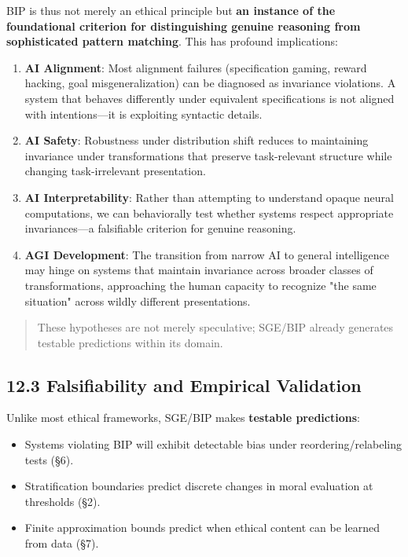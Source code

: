 \documentclass[12pt]{article}
\theoremstyle{plain}
\theoremstyle{definition}
\theoremstyle{remark}
\begin{document}
BIP is thus not merely an ethical principle but \textbf{an instance of
the foundational criterion for distinguishing genuine reasoning from
sophisticated pattern matching}. This has profound implications:

\begin{enumerate}
\item
  \textbf{AI Alignment}: Most alignment failures (specification gaming,
  reward hacking, goal misgeneralization) can be diagnosed as invariance
  violations. A system that behaves differently under equivalent
  specifications is not aligned with intentions---it is exploiting
  syntactic details.
\item
  \textbf{AI Safety}: Robustness under distribution shift reduces to
  maintaining invariance under transformations that preserve
  task-relevant structure while changing task-irrelevant presentation.
\item
  \textbf{AI Interpretability}: Rather than attempting to understand
  opaque neural computations, we can behaviorally test whether systems
  respect appropriate invariances---a falsifiable criterion for genuine
  reasoning.
\item
  \textbf{AGI Development}: The transition from narrow AI to general
  intelligence may hinge on systems that maintain invariance across
  broader classes of transformations, approaching the human capacity to
  recognize "the same situation" across wildly different presentations.
\end{enumerate}

\begin{quote}
These hypotheses are not merely speculative; SGE/BIP already generates
testable predictions within its domain.
\end{quote}

\subsection{12.3 Falsifiability and Empirical
Validation}\label{falsifiability-and-empirical-validation}

Unlike most ethical frameworks, SGE/BIP makes \textbf{testable
predictions}:

\begin{itemize}
\item
  Systems violating BIP will exhibit detectable bias under
  reordering/relabeling tests (§6).
\item
  Stratification boundaries predict discrete changes in moral evaluation
  at thresholds (§2).
\item
  Finite approximation bounds predict when ethical content can be
  learned from data (§7).
\end{itemize}
\end{document}
